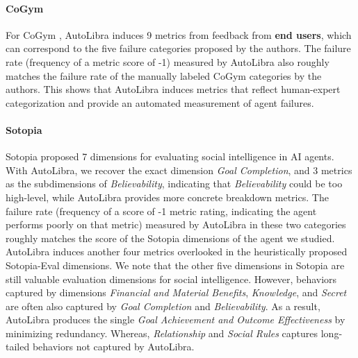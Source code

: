 \paragraph{CoGym}
For CoGym \citep{shao2024collaborative}, AutoLibra induces 9 metrics from
feedback from \textbf{end users}, which can correspond to the five failure
categories proposed by the authors. The failure rate (frequency of a metric
score of -1) measured by AutoLibra also roughly matches the failure rate of the
manually labeled CoGym categories by the authors. This shows that AutoLibra induces
metrics that reflect human-expert categorization and provide an automated measurement
of agent failures.


\paragraph{Sotopia}
Sotopia \citep{zhousotopia} proposed 7 dimensions for evaluating
social intelligence in AI agents. With AutoLibra, we recover the exact dimension
\emph{Goal Completion}, and 3 metrics as the subdimensions of \emph{Believability},
indicating that \textit{Believability} could be too high-level, while AutoLibra provides
more concrete breakdown metrics. The failure rate (frequency of a score of -1
metric rating, indicating the agent performs poorly on that metric) measured by
AutoLibra in these two categories roughly matches the score of the Sotopia
dimensions of the agent we studied. AutoLibra induces another four metrics 
overlooked in the heuristically proposed Sotopia-Eval dimensions. We note that
the other five dimensions in Sotopia are still valuable evaluation dimensions
for social intelligence. However, behaviors captured by dimensions \emph{Financial
and Material Benefits}, \emph{Knowledge}, and \emph{Secret} are often also captured
by \textit{Goal Completion} and \textit{Believability}. As a result, AutoLibra produces
the single \textit{Goal Achievement and Outcome Effectiveness} by minimizing
redundancy. Whereas, \textit{Relationship} and \textit{Social Rules} captures
long-tailed behaviors not captured by AutoLibra.


